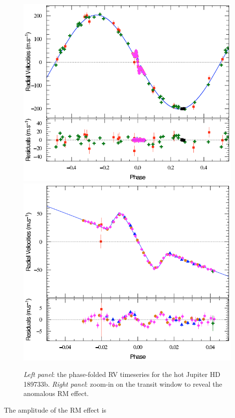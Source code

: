 \begin{figure}
\centering
\includegraphics[scale=.3]{figures/hd189733rm1.png}
\includegraphics[scale=.3]{figures/hd189733rm2.png}
\caption{\emph{Left panel}: the phase-folded RV timeseries for the hot Jupiter 
HD 189733b. \emph{Right panel}: zoom-in on the transit window to reveal the anomalous 
RM effect. \parencite[Image credit:][]{triaud09} \label{fig:rm}}
\end{figure}

The amplitude of the RM effect is 

